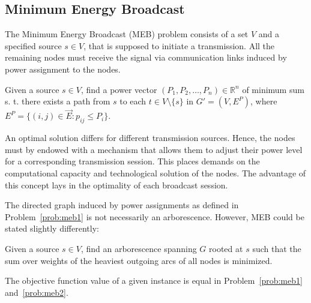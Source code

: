 \subsection{Minimum Energy Broadcast}

The Minimum Energy Broadcast (MEB) problem consists of a set $V$ and a specified source $s\in V$, that is supposed to initiate a transmission.
All the remaining nodes must receive the signal via communication links induced by power assignment to the nodes.
\begin{problem}\label{prob:meb1}
Given a source $s\in V$, find a power vector $(P_1,P_2,\dots,P_n)\in\mathbb{R}^n$ of minimum sum s. t. 
there exists a path from $s$ to each $t\in V\setminus\{s\}$ in $G'=(V,E^P)$, where $E^P=\{(i,j)\in \vec{E}: p_{ij}\leq P_i\}$.
\end{problem}
An optimal solution differs for different transmission sources.
Hence, the nodes must by endowed with a mechanism that allows them to adjust their power level for a corresponding transmission session.
This places demands on the computational capacity and technological solution of the nodes.
The advantage of this concept lays in the optimality of each broadcast session.

The directed graph induced by power assignments as defined in Problem~\ref{prob:meb1} is not necessarily an arborescence.
However, MEB could be stated slightly differently:
\begin{problem}\label{prob:meb2}
Given a source $s\in V$, find an arborescence spanning $G$ rooted at $s$ such that 
the sum over weights of the heaviest outgoing arcs of all nodes is minimized.
\end{problem}

\begin{observation}
The objective function value of a given instance is equal in Problem~\ref{prob:meb1} and~\ref{prob:meb2}.
\end{observation}

